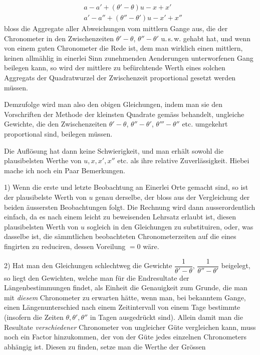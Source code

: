 \[
\begin{aligned}
&a-a'+(\theta'-\theta)u-x+x'\\
&a'-a''+(\theta''-\theta')u-x'+x''
\end{aligned}
\]
\noindent bloss die Aggregate aller Abweichungen vom mittlern Gange aus, die der Chronometer in
den Zwischenzeiten $\theta'-\theta$, $\theta''-\theta'$ u.\,s.\,w. gehabt hat, und wenn von einem guten
Chronometer die Rede ist, dem man wirklich einen mittlern, keinen allmählig in einerlei
Sinn zunehmenden Aenderungen unterworfenen Gang beilegen kann, so wird der
mittlere zu befürchtende Werth eines solchen Aggregats der Quadratwurzel der
Zwischenzeit proportional gesetzt werden müssen.

Demzufolge wird man also den obigen Gleichungen, indem man sie den Vorschriften der
Methode der kleinsten Quadrate gemäss behandelt, ungleiche Gewichte, die den
Zwischenzeiten $\theta'-\theta$, $\theta''-\theta'$, $\theta'''-\theta''$ etc. umgekehrt proportional sind,
beilegen müssen.

Die Auflösung hat dann keine Schwierigkeit, und man erhält sowohl die plausibelsten
Werthe von $u, x, x', x''$ etc. als ihre relative Zuverlässigkeit. Hiebei mache ich noch ein
Paar Bemerkungen.

1) Wenn die erste und letzte Beobachtung an Einerlei Orte gemacht sind, so ist der
plausibelste Werth von $u$ genau derselbe, der bloss aus der Vergleichung der beiden
äussersten Beobachtungen folgt. Die Rechnung wird dann ausserordentlich einfach, da es
nach einem leicht zu beweisenden Lehrsatz erlaubt ist, diesen plausibelsten Werth von
$u$ sogleich in den Gleichungen zu substituiren, oder, was dasselbe ist, die sämmtlichen
beobachteten Chronometerzeiten auf die eines fingirten zu reduciren, dessen Voreilung
$=0$ wäre.

2) Hat man den Gleichungen schlechtweg die Gewichte $\dfrac{1}{\theta'-\theta}$, $\dfrac{1}{\theta''-\theta'}$
beigelegt, so liegt den Gewichten, welche man für die Endresultate der
Längenbestimmungen findet, als Einheit die Genauigkeit zum Grunde, die man mit
\emph{diesem} Chronometer zu erwarten hätte, wenn man, bei bekanntem Gange, einen
Längenunterschied nach einem Zeitintervall von einem Tage bestimmte (insofern die
Zeiten $\theta, \theta', \theta''$ in Tagen ausgedrückt sind). Allein damit man die Resultate
\emph{verschiedener} Chronometer von ungleicher Güte vergleichen kann, muss noch ein
Factor hinzukommen, der von der Güte jedes einzelnen Chronometers abhängig ist.
Diesen zu finden, setze man die Werthe der Grössen

